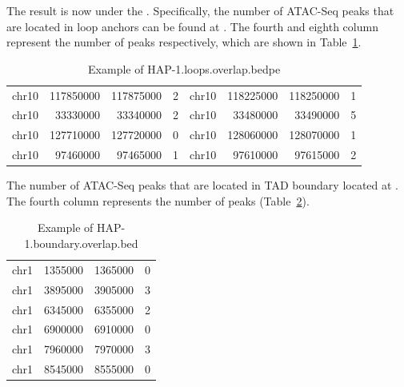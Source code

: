 \documentclass{article}
\begin{document}
The result is now under the .
Specifically, the number of ATAC-Seq peaks that are located in loop anchors can be found at .
The fourth and eighth column represent the number of peaks respectively, which are shown in Table~\ref{tab:loop-overlap}.

\begin{table}
	\centering

	\caption{Example of HAP-1.loops.overlap.bedpe}
	\label{tab:loop-overlap}



	\begin{tabular}{|l|r|r|r|l|r|r|r|}
		chr10 & \num{117850000} & \num{117875000} & \num{2} & chr10 & \num{118225000} & \num{118250000} & \num{1} \\
		chr10 & \num{33330000}  & \num{33340000}  & \num{2} & chr10 & \num{33480000}  & \num{33490000}  & \num{5} \\
		chr10 & \num{127710000} & \num{127720000} & \num{0} & chr10 & \num{128060000} & \num{128070000} & \num{1} \\
		chr10 & \num{97460000}  & \num{97465000}  & \num{1} & chr10 & \num{97610000}  & \num{97615000}  & \num{2} \\
	\end{tabular}
\end{table}


The number of ATAC-Seq peaks that are located in TAD boundary located at .
The fourth column represents the number of peaks (Table~\ref{tab:bound-overlap}).


\begin{table}
	\centering

	\caption{Example of HAP-1.boundary.overlap.bed}
	\label{tab:bound-overlap}



	\begin{tabular}{|l|r|r|r|}
		chr1 & \num{1355000} & \num{1365000} & \num{0} \\
		chr1 & \num{3895000} & \num{3905000} & \num{3} \\
		chr1 & \num{6345000} & \num{6355000} & \num{2} \\
		chr1 & \num{6900000} & \num{6910000} & \num{0} \\

		chr1 & \num{7960000} & \num{7970000} & \num{3} \\
		chr1 & \num{8545000} & \num{8555000} & \num{0} \\
	\end{tabular}
\end{table}



\end{document}
